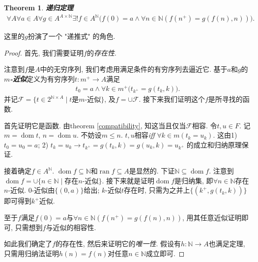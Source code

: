 \documentclass[UTF8,AutoFakeBold]{ctexart}
\theoremstyle{plain}
\newtheorem{theorem}{Theorem}[section] %
\theoremstyle{definition}
\newcommand*{\indexbf}[1]{\textit{\textbf{#1}}\index{#1}}
\DeclareMathOperator{\dom}{dom}
\DeclareMathOperator{\ran}{ran}
\begin{document}
\begin{theorem} \indexbf{递归定理}
\begin{align*}
	\forall A\forall a\in A\forall g \in A^{A\times \mathbb N}\exists ! f\in A^\mathbb N\big(
		f(0)=a \wedge \forall n\in \mathbb N(
			f(n^+) = g(f(n),n))\big).
\end{align*}
\end{theorem}
这里的$g$扮演了一个 "递推式" 的角色.
\begin{proof}
首先, 我们需要证明$f$的\emph{存在性}. 

注意到$f$是$A$中的无穷序列, 我们考虑用满足条件的有穷序列去逼近它.
基于$a$和$g$的\indexbf{$m$-近似}定义为有穷序列$t\colon m^+\to A$满足
\begin{align*}
	t_0 = a\wedge \forall k\in m^+\big(
		t_{k^+} = g(t_k,k)\big).
\end{align*}
并记$
\mathcal F = \{ t\in 2^{\mathbb N\times A}\mid t\text{是$m$-近似}\}$, 及$
f = \cup \mathcal F$. 接下来我们证明这个$f$是所寻找的函数.

首先证明它是函数. 
由theorem \ref{compatibility}, 知这当且仅当$\mathcal F$相容. 
令$t,u\in F$. 记$m=\dom t$, $n=\dom u$. 不妨设$m\leq n$.
$t,u$相容\emph{iff} $\forall k\in m (t_k = u_k)$. 
这由1) $t_0=u_0=a$; 2) $t_k =u_k \to t_{k^+} = g( t_k,k) = g(u_k,k) = u_{k^+}$ 的成立和归纳原理保证.

接着确定$f \in A^\mathbb N$. $\dom f \subseteq \mathbb N $和$\ran f \subseteq A$是显然的.
下证$\mathbb N \subseteq \dom f$. 注意到$\dom f = \cup \{ n\in \mathbb N\mid \text{存在$n$-近似}\}$.
接下来就是证明$\dom f$是归纳集, 即$\forall n\in \mathbb N$存在$n$-近似. 
$0$-近似由$\{(0,a)\}$给出; $k$-近似$t$存在时, 只需为之并上$\{(k^+, g(t_k, k))\}$即可得到$k^+$近似.

至于$f$满足$f(0)=a$与$\forall n\in \mathbb N(f(n^+) = g(f(n),n))$, 用其任意近似证明即可, 只需想到$f$与近似的相容性.

如此我们确定了$f$的存在性, 然后来证明它的\emph{唯一性}. 
假设有$h: \mathbb N \to A$也满足定理, 只需用归纳法证明$h(n)=f(n)$对任意$n\in \mathbb N$成立即可. 
\end{proof}

\printindex
\printbibliography
\end{document}
